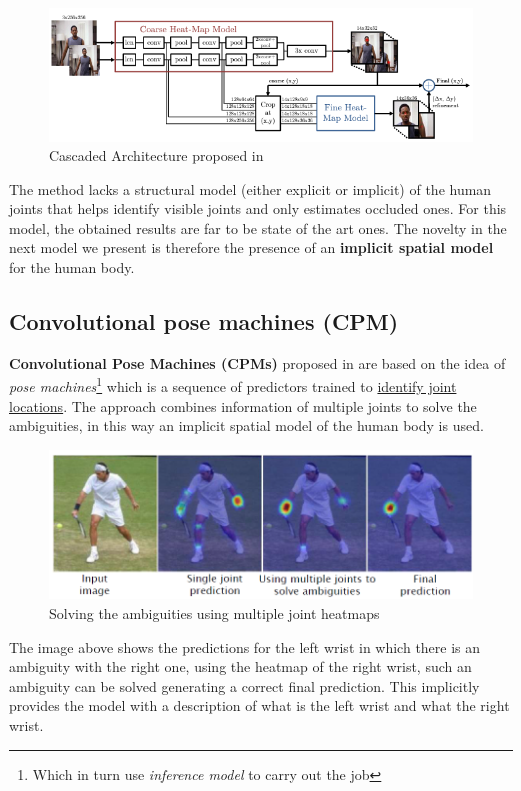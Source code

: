 \begin{figure}[h]
    \centering
    \includegraphics[scale=1]{img/ConvNetPose.png}
    \caption{Cascaded Architecture proposed in \cite{ConvNetPose}}
\end{figure}
The method lacks a structural model (either explicit or implicit) of the human joints that helps identify visible joints and only estimates occluded ones. For this model, the obtained results are far to be state of the art ones. The novelty in the next model we present is therefore the presence of an \textbf{implicit spatial model} for the human body.

\subsection{Convolutional pose machines (CPM)}
\textbf{Convolutional Pose Machines (CPMs)} proposed in \cite{wei2016convolutional} are based on the idea of \textit{pose machines}\footnote{Which in turn use \textit{inference model} to carry out the job } which is a sequence of predictors trained to \underline{identify joint locations}. The approach combines information of multiple joints to solve the ambiguities, in this way an implicit spatial model of the human body is used. 

\begin{figure}[h]
    \centering
    \includegraphics[scale=0.7]{img/CPM1.png}
    \caption{Solving the ambiguities using multiple joint heatmaps}
\end{figure}
The image above shows the predictions for the left wrist in which there is an ambiguity with the right one, using the heatmap of the right wrist, such an ambiguity can be solved generating a correct final prediction. This implicitly provides the model with a description of what is the left wrist and what the right wrist.


